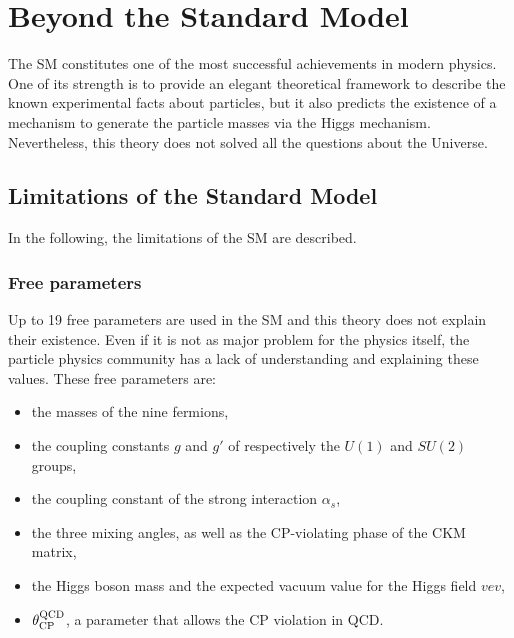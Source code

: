 
  \section{Beyond the Standard Model}

  The \gls{SM} constitutes one of the most successful achievements in modern physics.
  One of its strength is to provide an elegant theoretical framework to describe the known experimental facts about particles, but it also predicts the existence of a mechanism to generate the particle masses via the Higgs mechanism.
  Nevertheless, this theory does not solved all the questions about the Universe.
  
    \subsection{Limitations of the Standard Model}

    In the following, the limitations of the \gls{SM} are described.


      \subsubsection{Free parameters}

      Up to 19 free parameters are used in the \gls{SM} and this theory does not explain their existence.
      Even if it is not as major problem for the physics itself, the particle physics community has a lack of understanding and explaining these values.
      These free parameters are: 
      \begin{itemize}
        \item the masses of the nine fermions,
        \item the coupling constants $g$ and $g'$ of respectively the $U(1)$ and $SU(2)$ groups,
        \item the coupling constant of the strong interaction $\alpha_s$,
        \item the three mixing angles, as well as the CP-violating phase of the CKM matrix,
        \item the Higgs boson mass and the expected vacuum value for the Higgs field $vev$,
        \item $\theta^{\rm{QCD}}_{\rm{CP}}$, a parameter that allows the CP violation in \gls{QCD}.
      \end{itemize}

